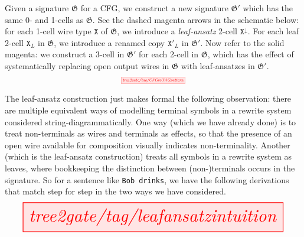 
\begin{construction}
Given a signature $\mathfrak{G}$ for a CFG, we construct a new signature $\mathfrak{G}'$ which has the same 0- and 1-cells as $\mathfrak{G}$. See the dashed magenta arrows in the schematic below: for each 1-cell wire type $\texttt{X}$ of $\mathfrak{G}$, we introduce a \emph{leaf-ansatz} 2-cell $\texttt{X}^\downarrow$. For each leaf 2-cell $\texttt{X}_L$ in $\mathfrak{G}$, we introduce a renamed copy $\texttt{X}'_L$ in $\mathfrak{G}'$. Now refer to the solid magenta: we construct a 3-cell in $\mathfrak{G}'$ for each 2-cell in $\mathfrak{G}$, which has the effect of systematically replacing open output wires in $\mathfrak{G}$ with leaf-ansatzes in $\mathfrak{G}'$.
\[\scalebox{0.52}{\tikzfig{tree2gate/tag/CFGtoTAGpattern}}\]
\end{construction}
\clearpage

\begin{example}
The leaf-ansatz construction just makes formal the following observation: there are multiple equivalent ways of modelling terminal symbols in a rewrite system considered string-diagrammatically. One way (which we have already done) is to treat non-terminals as wires and terminals as effects, so that the presence of an open wire available for composition visually indicates non-terminality. Another (which is the leaf-ansatz construction) treats all symbols in a rewrite system as leaves, where bookkeeping the distinction between (non-)terminals occurs in the signature. So for a sentence like \texttt{Bob drinks}, we have the following derivations that match step for step in the two ways we have considered.
\[\resizebox{\textwidth}{!}{\tikzfig{tree2gate/tag/leafansatzintuition}}\]
\end{example}

